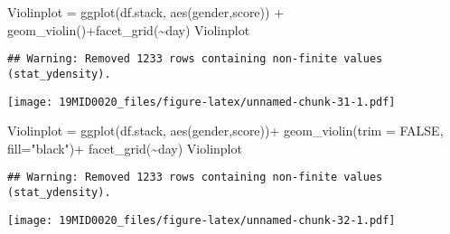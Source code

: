 \documentclass[
]{article}
\newenvironment{Shaded}{\begin{snugshade}}{\end{snugshade}}
\newcommand{\AttributeTok}[1]{\textcolor[rgb]{0.77,0.63,0.00}{#1}}
\newcommand{\ConstantTok}[1]{\textcolor[rgb]{0.00,0.00,0.00}{#1}}
\newcommand{\FunctionTok}[1]{\textcolor[rgb]{0.00,0.00,0.00}{#1}}
\newcommand{\NormalTok}[1]{#1}
\newcommand{\OtherTok}[1]{\textcolor[rgb]{0.56,0.35,0.01}{#1}}
\newcommand{\SpecialCharTok}[1]{\textcolor[rgb]{0.00,0.00,0.00}{#1}}
\newcommand{\StringTok}[1]{\textcolor[rgb]{0.31,0.60,0.02}{#1}}
\begin{document}
\begin{Shaded}
\begin{Highlighting}[]
\NormalTok{Violinplot }\OtherTok{=} \FunctionTok{ggplot}\NormalTok{(df.stack, }\FunctionTok{aes}\NormalTok{(gender,score)) }\SpecialCharTok{+} 
            \FunctionTok{geom\_violin}\NormalTok{()}\SpecialCharTok{+}\FunctionTok{facet\_grid}\NormalTok{(}\SpecialCharTok{\textasciitilde{}}\NormalTok{day)}
\NormalTok{Violinplot}
\end{Highlighting}
\end{Shaded}

\begin{verbatim}
## Warning: Removed 1233 rows containing non-finite values (stat_ydensity).
\end{verbatim}

\texttt{[image: 19MID0020\_files/figure-latex/unnamed-chunk-31-1.pdf]}

\begin{Shaded}
\begin{Highlighting}[]
\NormalTok{Violinplot }\OtherTok{=} \FunctionTok{ggplot}\NormalTok{(df.stack, }\FunctionTok{aes}\NormalTok{(gender,score))}\SpecialCharTok{+}
             \FunctionTok{geom\_violin}\NormalTok{(}\AttributeTok{trim =} \ConstantTok{FALSE}\NormalTok{, }\AttributeTok{fill=}\StringTok{"black"}\NormalTok{)}\SpecialCharTok{+}
             \FunctionTok{facet\_grid}\NormalTok{(}\SpecialCharTok{\textasciitilde{}}\NormalTok{day)}
\NormalTok{Violinplot}
\end{Highlighting}
\end{Shaded}

\begin{verbatim}
## Warning: Removed 1233 rows containing non-finite values (stat_ydensity).
\end{verbatim}

\texttt{[image: 19MID0020\_files/figure-latex/unnamed-chunk-32-1.pdf]}
\end{document}
